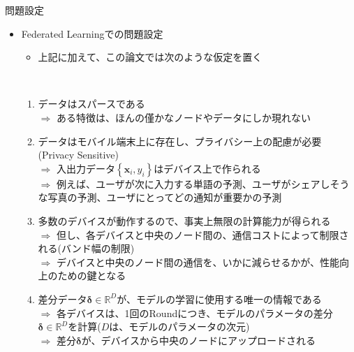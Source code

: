 \documentclass[dvipdfmx,notheorems,t]{beamer}
\begin{document}
\begin{frame}{問題設定}

\begin{itemize}
	\item Federated Learningでの問題設定
	\begin{itemize}
		\item 上記に加えて、この論文では次のような仮定を置く
	\end{itemize} \
		
	\begin{enumerate}
		\item データは\alert{スパース}である \\
		$\Rightarrow$ ある特徴は、ほんの僅かなノードやデータにしか現れない
		\newline
		
		\item データはモバイル端末上に存在し、プライバシー上の配慮が必要(\alert{Privacy Sensitive}) \\
		$\Rightarrow$ 入出力データ$\left\{ \bm{x}_i, y_i \right\}$はデバイス上で作られる \\
		$\Rightarrow$ 例えば、ユーザが次に入力する単語の予測、ユーザがシェアしそうな写真の予測、ユーザにとってどの通知が重要かの予測
		\newline
		
		\item 多数のデバイスが動作するので、事実上無限の計算能力が得られる \\
		$\Rightarrow$ 但し、各デバイスと中央のノード間の、通信コストによって制限される(バンド幅の制限) \\
		$\Rightarrow$ デバイスと中央のノード間の通信を、いかに減らせるかが、性能向上のための鍵となる
		\newline
		
		\item 差分データ$\bm{\delta} \in \mathbb{R}^D$が、モデルの学習に使用する\alert{唯一の情報}である \\
		$\Rightarrow$ 各デバイスは、1回のRoundにつき、モデルのパラメータの差分$\bm{\delta} \in \mathbb{R}^D$を計算($D$は、モデルのパラメータの次元) \\
		$\Rightarrow$ 差分$\bm{\delta}$が、デバイスから中央のノードにアップロードされる
	\end{enumerate}
\end{itemize}

\end{frame}
\end{document}
